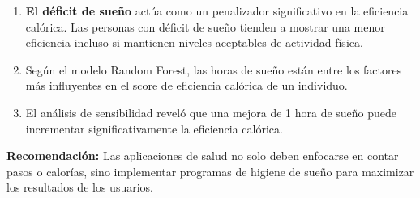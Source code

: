 \documentclass{article}
\providecommand{\tightlist}{\setlength{\itemsep}{0pt}\setlength{\parskip}{0pt}}
\begin{document}
\begin{enumerate}
    \tightlist
    \item
          \textbf{El déficit de sueño} actúa como un penalizador significativo
          en la eficiencia calórica. Las personas con déficit de sueño tienden a
          mostrar una menor eficiencia incluso si mantienen niveles aceptables
          de actividad física.
    \item
          Según el modelo Random Forest, las horas de sueño están entre los
          factores más influyentes en el score de eficiencia calórica de un
          individuo.
    \item
          El análisis de sensibilidad reveló que una mejora de 1 hora de sueño
          puede incrementar significativamente la eficiencia calórica.
\end{enumerate}

\textbf{Recomendación:} Las aplicaciones de salud no solo deben
enfocarse en contar pasos o calorías, sino implementar programas de
higiene de sueño para maximizar los resultados de los usuarios.


\end{document}
